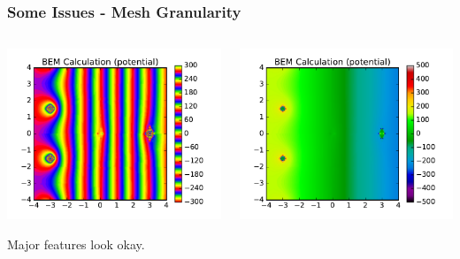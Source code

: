 \documentclass[xcolor=dvipsnames]{beamer}
\begin{document}
\begin{frame}
  \frametitle{Some Issues - Mesh Granularity}

  \vspace{-5mm}

  \begin{columns}
    \begin{column}{0.5\textwidth}
      \begin{center}
        \includegraphics[height=0.6\textheight]{fluctuations1.pdf}

        \scriptsize Major features look okay.
      \end{center}
    \end{column}
    \begin{column}{0.5\textwidth}
      \begin{center}
        \includegraphics[height=0.6\textheight]{fluctuations2.pdf}


\end{center}
\end{column}
\end{columns}
\end{frame}
\end{document}
